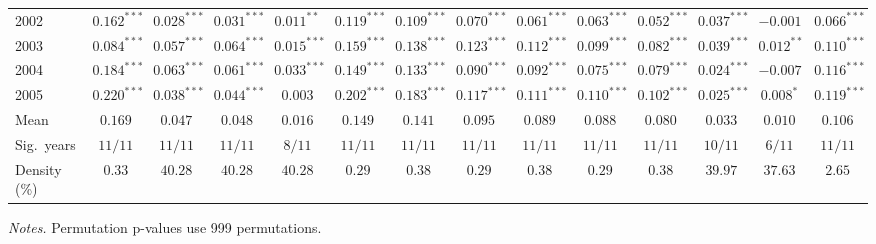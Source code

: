 \begin{table}[htbp]
\begin{tabular}{lccccccccccccc}
    2002 & $0.162^{***}$ & $0.028^{***}$ & $0.031^{***}$ & $0.011^{**}$ & $0.119^{***}$ & $0.109^{***}$ & $0.070^{***}$ & $0.061^{***}$ & $0.063^{***}$ & $0.052^{***}$ & $0.037^{***}$ & $-0.001$ & $0.066^{***}$ \\
    2003 & $0.084^{***}$ & $0.057^{***}$ & $0.064^{***}$ & $0.015^{***}$ & $0.159^{***}$ & $0.138^{***}$ & $0.123^{***}$ & $0.112^{***}$ & $0.099^{***}$ & $0.082^{***}$ & $0.039^{***}$ & $0.012^{**}$ & $0.110^{***}$ \\
    2004 & $0.184^{***}$ & $0.063^{***}$ & $0.061^{***}$ & $0.033^{***}$ & $0.149^{***}$ & $0.133^{***}$ & $0.090^{***}$ & $0.092^{***}$ & $0.075^{***}$ & $0.079^{***}$ & $0.024^{***}$ & $-0.007$ & $0.116^{***}$ \\
    2005 & $0.220^{***}$ & $0.038^{***}$ & $0.044^{***}$ & $0.003$ & $0.202^{***}$ & $0.183^{***}$ & $0.117^{***}$ & $0.111^{***}$ & $0.110^{***}$ & $0.102^{***}$ & $0.025^{***}$ & $0.008^{*}$ & $0.119^{***}$ \\
    \midrule
    Mean & $0.169$ & $0.047$ & $0.048$ & $0.016$ & $0.149$ & $0.141$ & $0.095$ & $0.089$ & $0.088$ & $0.080$ & $0.033$ & $0.010$ & $0.106$ \\
    Sig.\ years & $11/11$ & $11/11$ & $11/11$ & $8/11$ & $11/11$ & $11/11$ & $11/11$ & $11/11$ & $11/11$ & $11/11$ & $10/11$ & $6/11$ & $11/11$ \\
    Density (\%) & $0.33$ & $40.28$ & $40.28$ & $40.28$ & $0.29$ & $0.38$ & $0.29$ & $0.38$ & $0.29$ & $0.38$ & $39.97$ & $37.63$ & $2.65$ \\
    \bottomrule
  \end{tabular}
  \begin{tablenotes}\footnotesize
  \item \emph{Notes.} Permutation p-values use 999 permutations.
  \end{tablenotes}
\end{table}


\clearpage
 
